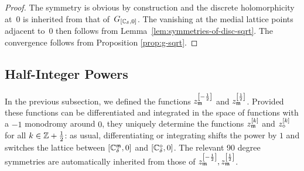 \documentclass[12pt,oneside,english]{amsart}
\numberwithin{equation}{section}
\numberwithin{figure}{section}
\theoremstyle{plain}
\theoremstyle{plain}
\theoremstyle{plain}
\theoremstyle{plain}
\theoremstyle{remark}
\theoremstyle{definition}
\theoremstyle{plain}
\theoremstyle{plain}
\numberwithin{thm}{section}
\begin{document}
\begin{proof}
The symmetry is obvious by construction and the discrete holomorphicity
at~$0$ is inherited from that of~$G_{{\left[ {\mathbb{C}_{{\delta}}}, 0 \right]}}$.
The vanishing at the medial lattice points adjacent to~$0$ then follows from
Lemma~\ref{lem:symmetries-of-disc-sqrt}.
The convergence follows from Proposition \ref{prop:g-sqrt}.
\end{proof}

\subsection{Half-Integer Powers}

In the previous subsection, we defined the functions 
$z_{\mathfrak{m}}^{\left[-\frac{1}{2}\right]}$
and $z_{\mathfrak{m}}^{\left[\frac{1}{2}\right]}$. Provided these functions
can be differentiated and integrated in the space of functions with
a $-1$ monodromy around $0$, they uniquely determine the functions
$z_{\mathfrak{m}}^{\left[k\right]}$ and $z_{\diamond}^{\left[k\right]}$ for
all $k\in\mathbb{Z} +\frac{1}{2}$: as usual, differentiating or integrating
shifts the power by $1$ and switches the lattice between 
${\left[ {\mathbb{C}_{{\delta}}^{\mathfrak{m}}}, 0 \right]}$
and ${\left[ {\mathbb{C}_{{\delta}}^{\diamond}}, 0 \right]}$. The relevant
90 degree symmetries are automatically inherited from those of 
$z_{\mathfrak{m}}^{\left[-\frac{1}{2}\right]},z_{\mathfrak{m}}^{\left[\frac{1}{2}\right]}$. 
\end{document}

